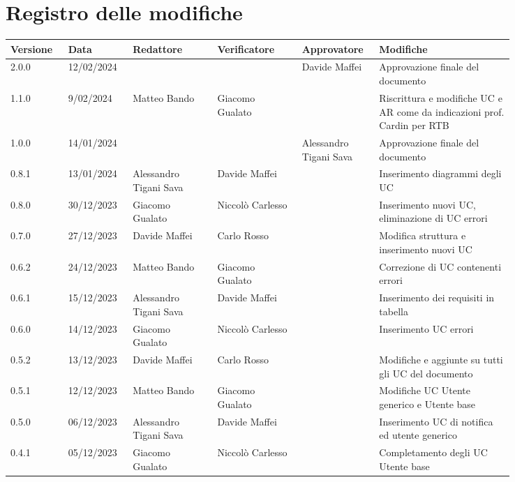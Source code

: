 \section*{Registro delle modifiche}


{
\renewcommand{\arraystretch}{1.5}
\scriptsize
\begin{longtable}{p{0.10\linewidth}p{0.10\linewidth}p{0.15\linewidth}p{0.15\linewidth}p{0.10\linewidth}p{0.24\linewidth}}
	\textbf{Versione} 	& \textbf{Data} & \textbf{Redattore}	& \textbf{Verificatore} & \textbf{Approvatore} 	& \textbf{Modifiche} \\
	\hline
	2.0.0	& 12/02/2024 	&						& 						& Davide Maffei & Approvazione finale del documento\\
	\hline
	1.1.0	& 9/02/2024 	&	Matteo Bando		& Giacomo Gualato		&  & Riscrittura e modifiche UC e AR come da indicazioni prof. Cardin per RTB\\
	\hline
	1.0.0	& 14/01/2024 	&						& 						& Alessandro Tigani Sava & Approvazione finale del documento\\
	\hline
	0.8.1	& 13/01/2024 	& Alessandro Tigani Sava & Davide Maffei 		&	& Inserimento diagrammi degli UC \\
	\hline
	0.8.0	& 30/12/2023 	& Giacomo Gualato 		& Niccolò Carlesso 		&	& Inserimento nuovi UC, eliminazione di UC errori \\
	\hline
	0.7.0	& 27/12/2023 	& Davide Maffei 		& Carlo Rosso 			&	& Modifica struttura e inserimento nuovi UC \\
	\hline
	0.6.2	& 24/12/2023 	& Matteo Bando 			& Giacomo Gualato 		&	& Correzione di UC contenenti errori 	\\
	\hline
	0.6.1	& 15/12/2023 	& Alessandro Tigani Sava & Davide Maffei 		&	& Inserimento dei requisiti in tabella 	\\
	\hline
	0.6.0	& 14/12/2023 	& Giacomo Gualato 		& Niccolò Carlesso 		&	& Inserimento UC errori 				\\
	\hline
	0.5.2	& 13/12/2023	& Davide Maffei 		& Carlo Rosso 			&	& Modifiche e aggiunte su tutti gli UC del documento \\
	\hline
	0.5.1	& 12/12/2023 	& Matteo Bando 			& Giacomo Gualato 		&	& Modifiche UC Utente generico e Utente base 	\\
	\hline
	0.5.0	& 06/12/2023	& Alessandro Tigani Sava & Davide Maffei		&	& Inserimento UC di notifica ed utente generico	\\
	\hline
	0.4.1	& 05/12/2023	& Giacomo Gualato		& Niccolò Carlesso		&	& Completamento degli UC Utente base			\\

\end{longtable}}
